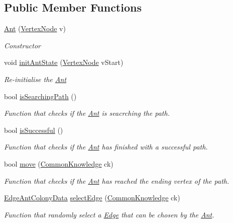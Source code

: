 \subsection*{Public Member Functions}
\begin{DoxyCompactItemize}
\item 
\hyperlink{classAnt_a80dccc0945f0093247a6eade6ddc9d15}{Ant} (\hyperlink{classVertexNode}{Vertex\+Node} v)
\begin{DoxyCompactList}\small\item\em Constructor \end{DoxyCompactList}\item 
void \hyperlink{classAnt_a21bc4c107d9bbaf840b621ea21ebf385}{init\+Ant\+State} (\hyperlink{classVertexNode}{Vertex\+Node} v\+Start)
\begin{DoxyCompactList}\small\item\em Re-\/initialise the \hyperlink{classAnt}{Ant} \end{DoxyCompactList}\item 
bool \hyperlink{classAnt_acd0b755b859a34440750cf7a74d421e9}{is\+Searching\+Path} ()
\begin{DoxyCompactList}\small\item\em Function that checks if the \hyperlink{classAnt}{Ant} is seacrching the path. \end{DoxyCompactList}\item 
bool \hyperlink{classAnt_aa60ce1095d0872a98c732a924c567281}{is\+Successful} ()
\begin{DoxyCompactList}\small\item\em Function that checks if the \hyperlink{classAnt}{Ant} has finished with a successful path. \end{DoxyCompactList}\item 
bool \hyperlink{classAnt_a1ffa2bfbfbcd90222606166c6237bb5f}{move} (\hyperlink{classCommonKnowledge}{Common\+Knowledge} ck)
\begin{DoxyCompactList}\small\item\em Function that checks if the \hyperlink{classAnt}{Ant} has reached the ending vertex of the path. \end{DoxyCompactList}\item 
\hyperlink{classEdgeAntColonyData}{Edge\+Ant\+Colony\+Data} \hyperlink{classAnt_aca5c3a7ab1ea403f4bd4accecad6d7e9}{select\+Edge} (\hyperlink{classCommonKnowledge}{Common\+Knowledge} ck)
\begin{DoxyCompactList}\small\item\em Function that randomly select a \hyperlink{classEdge}{Edge} that can be chosen by the \hyperlink{classAnt}{Ant}. \end{DoxyCompactList}\item 

\end{DoxyCompactItemize}
